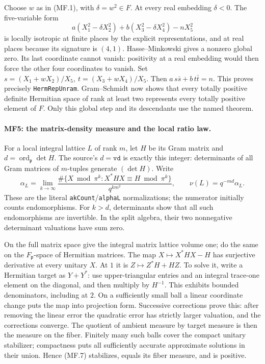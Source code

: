 Choose \(w\) as in (MF.1), with \(\delta=w^2\in F\).
At every real embedding \(\delta<0\).
The five-variable form
\[
 a(X_1^2-\delta X_2^2)+b(X_3^2-\delta X_4^2)-nX_5^2   \tag{MF.6}
\]
is locally isotropic at finite places by the explicit representations,
and at real places because its signature is \((4,1)\).
Hasse--Minkowski gives a nonzero global zero. Its last coordinate
cannot vanish: positivity at a real embedding would then force the
other four coordinates to vanish. Set
\(s=(X_1+wX_2)/X_5,\ t=(X_3+wX_4)/X_5\).
Then \(a\,s\bar s+b\,t\bar t=n\).
This proves precisely \texttt{HermRepUnram}.
Gram--Schmidt now shows that every totally positive definite
Hermitian space of rank at least two represents every totally
positive element of \(F\). Only this global step and its descendants
use the named theorem.

\paragraph{MF5: the matrix-density measure and the local ratio law.}
For a local integral lattice \(L\) of rank \(m\), let \(H\) be its
Gram matrix and \(d=\operatorname{ord}_{\mathfrak p}\det H\).
The source's \(d=\texttt{vd}\) is exactly this integer: determinants
of all Gram matrices of \(m\)-tuples generate \((\det H)\).
Write
\[
 \alpha_L=\lim_{k\to\infty}
 \frac{\#\{X\bmod\pi^k:X^*HX\equiv H\bmod\pi^k\}}{q^{km^2}},
 \qquad \nu(L)=q^{-md}\alpha_L.                       \tag{MF.7}
\]
These are the literal \texttt{akCount}/\texttt{alphaL}
normalizations; the numerator initially counts endomorphisms.
For \(k>d\), determinants show that all such endomorphisms are
invertible. In the split algebra, their two nonnegative determinant
valuations have sum zero.

On the full matrix space give the integral matrix lattice volume
one; do the same on the \(F_{\mathfrak p}\)-space of Hermitian
matrices. The map \(X\mapsto X^*HX-H\) has surjective derivative at
every unitary \(X\). At \(1\) it is \(Z\mapsto Z^*H+HZ\).
To solve it, write a Hermitian target as \(Y+Y^*\):
use upper-triangular entries and an integral trace-one element on
the diagonal, and then multiply by \(H^{-1}\).
This exhibits bounded denominators, including at \(2\).
On a sufficiently small ball a linear coordinate change puts the
map into projection form. Successive corrections prove this:
after removing the linear error the quadratic error has strictly
larger valuation, and the corrections converge.
The quotient of ambient measure by target measure is then the
measure on the fiber. Finitely many such balls cover the compact
unitary stabilizer; compactness puts all sufficiently accurate
approximate solutions in their union. Hence (MF.7) stabilizes,
equals its fiber measure, and is positive.

